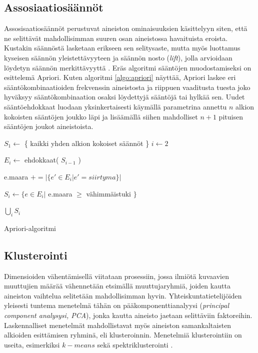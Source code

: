 \documentclass[finnish,gradu,twoside,12pt]{tktltiki}
\begin{document}
{\subsection{Assosiaatiosäännöt}

Assosisaatiosäännöt perustuvat aineiston ominaisuuksien käsittelyyn siten, että ne selittävät mahdollisimman suuren osan aineistossa havaituista eroista. Kustakin säännöstä lasketaan erikseen sen selitysaste, mutta myös luottamus kyseisen säännön yleistettävyyteen ja säännön nosto (\textit{lift}), jolla arvioidaan löydetyn säännön merkittävyyttä \citep[485--586]{Hastie2009}. Eräs algoritmi sääntöjen muodostamiseksi on \citet{Agrawal1994a} esittelemä Apriori. Kuten algoritmi \ref{algo:apriori} näyttää, Apriori laskee eri sääntökombinaatioiden frekvenssin aineistosta ja riippuen vaaditusta tuesta joko hyväksyy sääntökombinaation osaksi löydettyjä sääntöjä tai hylkää sen. Uudet sääntöehdokkaat luodaan yksinkertaisesti käymällä parametrina annettu $n$ alkion kokoisten sääntöjen joukko läpi ja lisäämällä siihen mahdolliset $n+1$ pituisen sääntöjen joukot aineistoista.

\begin{algorithm}
\begin{algorithmic}
\State $S_1 \gets$  \{ kaikki yhden alkion kokoiset säännöt \}
\State $i \gets 2$

  \State $E_i \gets$ ehdokkaat( $S_{i-1}$ )

		\State e.maara $ += |\{e' \in E_i | e' = siirtyma \}|$
	\EndFor 
  
  \State $S_i \gets \{ e \in E_i |$ e.maara $\geq$ vähimmäistuki $\}$
\EndWhile

\Return $\bigcup_i S_i$
\end{algorithmic}
\caption{Apriori-algoritmi}
\label{algo:apriori}
\end{algorithm}


\subsection{Klusterointi}

Dimensioiden vähentämisellä viitataan prosessiin, jossa ilmiötä kuvaavien muuttujien määrää vähennetään etsimällä muuttujaryhmiä, joiden kautta aineiston vaihtelua selitetään mahdollisimman hyvin. Yhteiskuntatietelijöiden yleisesti tuntema menetelmä tähän on pääkomponenttianalyysi (\textit{principal component analysysi, PCA}), jonka kautta aineisto jaetaan selittäviin faktoreihin. Laskennalliset menetelmät mahdollistavat myös aineiston samankaltaisten alkioiden esittämisen ryhminä, eli klusteroinnin. Menetelmiä klusterointiin on useita, esimerkiksi $k-means$ sekä spektriklusterointi \citep[485--586]{Hastie2009}.

}
\end{document}
